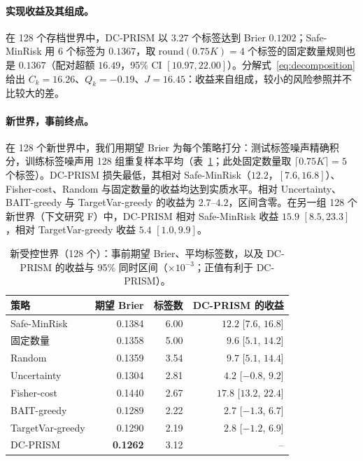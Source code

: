 \documentclass[runningheads]{llncs}
\begin{document}
\paragraph{实现收益及其组成。}在 128 个存档世界中，DC-PRISM 以 $3.27$ 个标签达到 Brier $0.1202$；Safe-MinRisk 用 6 个标签为 $0.1367$，取 $\mathrm{round}(0.75K)=4$ 个标签的固定数量规则也是 $0.1367$（配对超额 $16.49$，95\% CI $[10.97,22.00]$）。分解式~\eqref{eq:decomposition} 给出 $C_k=16.26$、$Q_k=-0.19$、$J=16.45$：收益来自组成，较小的风险参照并不比较大的差。

\paragraph{新世界，事前终点。}在 128 个新世界中，我们用期望 Brier 为每个策略打分：测试标签噪声精确积分，训练标签噪声用 128 组重复样本平均（表~\ref{tab:controlled}；此处固定数量取 $\lceil0.75K\rceil=5$ 个标签）。DC-PRISM 损失最低，其相对 Safe-MinRisk（$12.2$，$[7.6,16.8]$）、Fisher-cost、Random 与固定数量的收益均达到实质水平。相对 Uncertainty、BAIT-greedy 与 TargetVar-greedy 的收益为 $2.7$--$4.2$，区间含零。在另一组 128 个新世界（下文研究 F）中，DC-PRISM 相对 Safe-MinRisk 收益 $15.9$ $[8.5,23.3]$，相对 TargetVar-greedy 收益 $5.4$ $[1.0,9.9]$。

\begin{table}[t]
\caption{新受控世界（128 个）：事前期望 Brier、平均标签数，以及 DC-PRISM 的收益与 95\% 同时区间（$\times10^{-3}$；正值有利于 DC-PRISM）。}
\label{tab:controlled}
\centering\small
\begin{tabular}{lrrr}
\toprule
策略 & 期望 Brier & 标签数 & DC-PRISM 的收益 \\
\midrule
Safe-MinRisk & 0.1384 & 6.00 & $12.2$ [$7.6$, $16.8$] \\
固定数量 & 0.1358 & 5.00 & $9.6$ [$5.1$, $14.2$] \\
Random & 0.1359 & 3.54 & $9.7$ [$5.1$, $14.4$] \\
Uncertainty & 0.1304 & 2.81 & $4.2$ [$-0.8$, $9.2$] \\
Fisher-cost & 0.1440 & 2.67 & $17.8$ [$13.2$, $22.4$] \\
BAIT-greedy & 0.1289 & 2.22 & $2.7$ [$-1.3$, $6.7$] \\
TargetVar-greedy & 0.1290 & 2.19 & $2.8$ [$-1.2$, $6.9$] \\
DC-PRISM & \textbf{0.1262} & 3.12 & -- \\
\bottomrule
\end{tabular}
\end{table}
\end{document}
